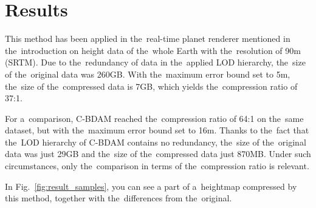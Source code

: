 \chapter{Results}\label{sec:results}

This method has been applied in the~real-time planet renderer mentioned in the~introduction on height data of the~whole Earth with the~resolution of 90m (SRTM). Due to the~redundancy of data in the~applied LOD hierarchy, the~size of the~original data was 260GB. With the~maximum error bound set to 5m, the~size of the~compressed data is 7GB, which yields the~compression ratio of 37:1.

For a~comparison, C-BDAM reached the~compression ratio of 64:1 on the~same dataset, but with the~maximum error bound set to 16m. Thanks to the~fact that the~LOD hierarchy of C-BDAM contains no redundancy, the~size of the~original data was just 29GB and the~size of the~compressed data just 870MB. Under such circumstances, only the~comparison in terms of the~compression ratio is relevant.

In Fig.~\ref{fig:result_samples}, you can see a part of a~heightmap compressed by this method, together with the~differences from the~original.

